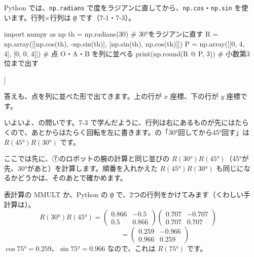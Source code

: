 Python では、\texttt{np.radians} で度をラジアンに直してから、\texttt{np.cos}・\texttt{np.sin} を使います。行列×行列は \texttt{@} です（7-1・7-3）。
\begin{bkcode}[Python]
import numpy as np
th = np.radians(30)                  \# 30°をラジアンに直す
R = np.array([[np.cos(th), -np.sin(th)],
              [np.sin(th),  np.cos(th)]])
P = np.array([[0, 4, 4],
              [0, 0, 4]])            \# 点 O・A・B を列に並べる
print(np.round(R @ P, 3))           \# 小数第3位まで出す
\end{bkcode}
\begin{bkcodeout}[実行結果]
[[0.    3.464 1.464]
 [0.    2.    5.464]]
\end{bkcodeout}
答えも、点を列に並べた形で出てきます。上の行が $x$ 座標、下の行が $y$ 座標です。


\label{bk:7-6:tsunagu}いよいよ、\bkhatenaref の問いです。7-3 で学んだように、行列は右にあるものが先にはたらくので、あとからはたらく回転を左に書きます。\bkhatenaref の「30°回してから45°回す」は $R(45°)R(30°)$ です。

ここでは先に、⑦のロボットの腕の計算と同じ並びの $R(30°)R(45°)$（45°が先、30°があと）を計算します。順番を入れかえた $R(45°)R(30°)$ も同じになるかどうかは、そのあとで確かめます。

表計算の MMULT か、Python の \texttt{@} で、2つの行列をかけてみます（くわしい手計算は）。
\[R(30°)R(45°)=\begin{pmatrix}0.866&-0.5\\0.5&0.866\end{pmatrix}\begin{pmatrix}0.707&-0.707\\0.707&0.707\end{pmatrix}\]
\[\phantom{R(30°)R(45°)}=\begin{pmatrix}0.259&-0.966\\0.966&0.259\end{pmatrix}\]
$\cos75°=0.259$、$\sin75°=0.966$ なので、これは $R(75°)$ です。

